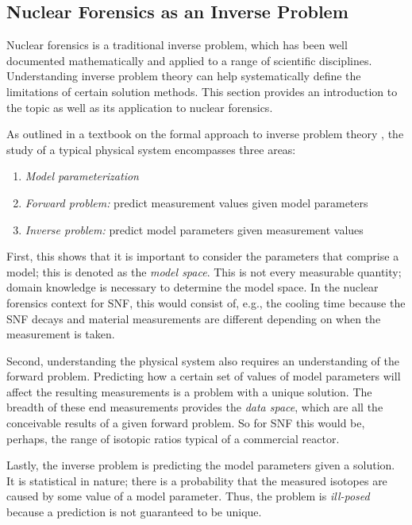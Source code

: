 \subsection{Nuclear Forensics as an Inverse Problem}
\label{sec:inverse}

Nuclear forensics is a traditional inverse problem, which has been well
documented mathematically and applied to a range of scientific disciplines.
Understanding inverse problem theory can help systematically define the
limitations of certain solution methods.  This section provides an introduction
to the topic as well as its application to nuclear forensics. 

As outlined in a textbook on the formal approach to inverse problem theory
\cite{inverse_theory}, the study of a typical physical system encompasses three
areas:
\begin{enumerate}
  \itemsep-0.75em
  \item \textit{Model parameterization}
  \item \textit{Forward problem:} predict measurement values given model parameters
  \item \textit{Inverse problem:} predict model parameters given measurement values
\end{enumerate}

First, this shows that it is important to consider the parameters that comprise
a model; this is denoted as the \textit{model space}. This is not every
measurable quantity; domain knowledge is necessary to determine the model
space. In the nuclear forensics context for \gls{SNF}, this would consist of,
e.g., the cooling time because the \gls{SNF} decays and material measurements
are different depending on when the measurement is taken.

Second, understanding the physical system also requires an understanding of the
forward problem. Predicting how a certain set of values of model parameters
will affect the resulting measurements is a problem with a unique solution.
The breadth of these end measurements provides the \textit{data space}, which
are all the conceivable results of a given forward problem. So for \gls{SNF}
this would be, perhaps, the range of isotopic ratios typical of a commercial
reactor. 

Lastly, the inverse problem is predicting the model parameters given a
solution.  It is statistical in nature; there is a probability that the
measured isotopes are caused by some value of a model parameter. Thus, the
problem is \textit{ill-posed} because a prediction is not guaranteed to be
unique. 

